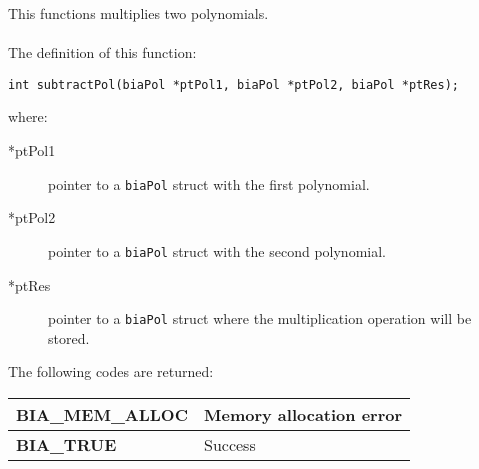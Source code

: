 This functions multiplies two polynomials.\\ \\
%
The definition of this function:
%
\begin{verbatim}
int subtractPol(biaPol *ptPol1, biaPol *ptPol2, biaPol *ptRes);
\end{verbatim}
%
where:
%
\begin{description}
\item[*ptPol1] pointer to a \texttt{biaPol} struct with the first polynomial.
\item[*ptPol2] pointer to a \texttt{biaPol} struct with the second polynomial.
\item[*ptRes] pointer to a \texttt{biaPol} struct where the multiplication operation will be stored.
\end{description}
%
The following codes are returned:
%
\begin{center}
\begin{tabular}{|l|l|}
\hline
\textbf{BIA\_MEM\_ALLOC} & Memory allocation error \\
\hline
\textbf{BIA\_TRUE} & Success \\
\hline
\end{tabular}
\end{center}
%
%







